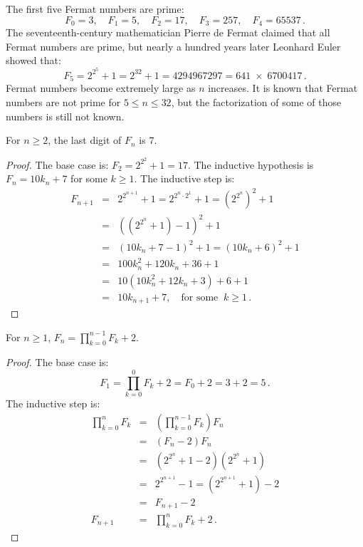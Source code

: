 The first five Fermat numbers are prime:
\[
F_0=3,\quad F_1=5,\quad F_2=17,\quad F_3=257,\quad F_4=65537\,.
\]
The seventeenth-century mathematician Pierre de Fermat claimed that all Fermat numbers are prime, but nearly a hundred years later Leonhard Euler showed that:
\[F_5=2^{2^5}+1 = 2^{32}+1 = 4294967297 = 641 \;\times\; 6700417\,.\]
Fermat numbers become extremely large as $n$ increases. It is known that Fermat numbers are not prime for $5\leq n \leq 32$, but the factorization of some of those numbers is still not known.

\begin{theorem}
For $n\geq 2$, the last digit of $F_n$ is $7$.
\end{theorem}
\begin{proof}
The base case is: $F_2=2^{2^2}+1=17$.
The inductive hypothesis is $F_n=10k_n+7$ for some $k\geq 1$. The inductive step is:
\begin{eqnarray*}
F_{n+1}&=&2^{2^{n+1}}+1=2^{2^{n}\cdot 2^1}+1=\left(2^{2^{n}}\right)^2+1\\
&=&\left(\left(2^{2^{n}}+1\right)-1\right)^2+1\\
&=&(10k_n+7-1)^2+1=(10k_n+6)^2+1\\
&=&100k_n^2+120k_n+36+1\\
&=&10(10k_n^2+12k_n+3)+6+1\\
&=&10k_{n+1}+7,\quad \textrm{for some} \;\;k\geq 1\,.
\end{eqnarray*}
\end{proof}


\begin{theorem}
For $n\geq 1$, $\displaystyle F_n = \prod_{k=0}^{n-1} F_k + 2$.
\end{theorem}
\begin{proof}
The base case is:
\[
F_1=\prod_{k=0}^{0} F_k + 2=F_0+2=3+2=5\,.
\]
The inductive step is:
\begin{eqnarray*}
\prod_{k=0}^{n}F_k&=&(\prod_{k=0}^{n-1}F_k) F_n \\
&=& (F_n-2)F_n\\
&=& (2^{2^n}+1-2)(2^{2^n}+1)\\
&=& 2^{2^{n+1}}-1= (2^{2^{n+1}}+1)-2\\
&=&F_{n+1}-2\\
F_{n+1}&=&\prod_{k=0}^{n}F_k + 2\,.
\end{eqnarray*}
\end{proof}



